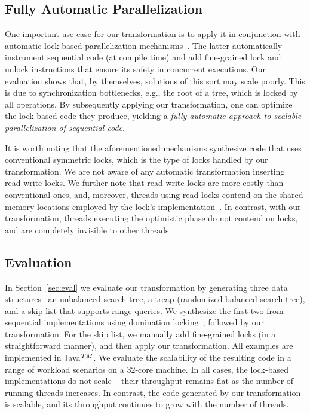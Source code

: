 \subsection{Fully Automatic Parallelization}
One important use case for our transformation is to apply it in conjunction with automatic lock-based 
parallelization mechanisms~\cite{Gueta2011,MZGB:POPL06}. 
The latter automatically instrument sequential code (at compile time) 
and add fine-grained lock and unlock instructions that ensure its safety in concurrent executions. 
Our evaluation shows that, by themselves, solutions of this sort may scale poorly.
This is due to synchronization bottlenecks, e.g., the root of a tree,
which is locked by all operations. 
By subsequently applying our transformation, one can optimize 
the lock-based code they produce, yielding a \emph{fully automatic approach to 
scalable parallelization of sequential code}. 

It is worth noting that the aforementioned mechanisms synthesize code that uses conventional symmetric locks, 
which is the type of locks handled by our transformation. We are not aware of any automatic transformation
inserting read-write locks. We further note that read-write locks 
are more costly than conventional ones, and, moreover, threads using 
read locks contend on the shared memory locations employed by the lock's implementation~\cite{xxx}. 
In contrast, with our transformation, threads executing the optimistic phase do not contend on locks,
and are completely invisible to other threads. 

\subsection{Evaluation}
In Section~\ref{sec:eval} we evaluate our transformation by generating three data structures-- an unbalanced search tree, a treap
(randomized balanced search tree), 
and a skip list that supports range queries. We synthesize the first two from sequential implementations using domination locking~\cite{Gueta2011}, followed by our transformation. 
For the skip list, we manually add fine-grained locks (in a straightforward manner), and then apply our transformation. 
All examples are implemented in Java$^{\sc TM}$. We evaluate the scalability of the resulting code 
in a range of workload scenarios on a $32$-core machine.
In all cases, the lock-based implementations do not scale -- 
their throughput remains flat as the number of running threads increases. In contrast, the code generated by our transformation 
is scalable, and its throughput continues to grow with the number of threads.

